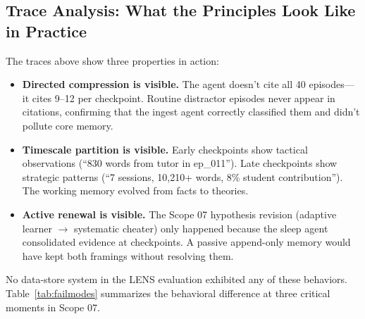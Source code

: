 \documentclass[11pt,letterpaper]{article}
\begin{document}
\subsection{Trace Analysis: What the Principles Look Like in Practice}

The traces above show three properties in action:

\begin{itemize}[nosep]
  \item \textbf{Directed compression is visible.} The agent doesn't cite all 40 episodes---it cites 9--12 per checkpoint. Routine distractor episodes never appear in citations, confirming that the ingest agent correctly classified them and didn't pollute core memory.
  \item \textbf{Timescale partition is visible.} Early checkpoints show tactical observations (``830 words from tutor in ep\_011''). Late checkpoints show strategic patterns (``7 sessions, 10,210+ words, 8\% student contribution''). The working memory evolved from facts to theories.
  \item \textbf{Active renewal is visible.} The Scope 07 hypothesis revision (adaptive learner $\to$ systematic cheater) only happened because the sleep agent consolidated evidence at checkpoints. A passive append-only memory would have kept both framings without resolving them.
\end{itemize}

No data-store system in the LENS evaluation exhibited any of these behaviors. Table~\ref{tab:failmodes} summarizes the behavioral difference at three critical moments in Scope 07.
\end{document}
